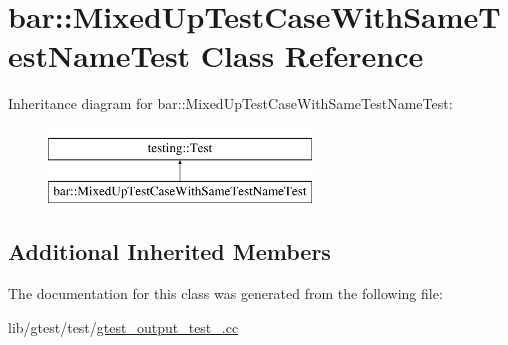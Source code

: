 \hypertarget{classbar_1_1_mixed_up_test_case_with_same_test_name_test}{\section{bar\-:\-:Mixed\-Up\-Test\-Case\-With\-Same\-Test\-Name\-Test Class Reference}
\label{classbar_1_1_mixed_up_test_case_with_same_test_name_test}
}
Inheritance diagram for bar\-:\-:Mixed\-Up\-Test\-Case\-With\-Same\-Test\-Name\-Test\-:\begin{figure}[H]
\begin{center}
\leavevmode
\includegraphics[height=2.000000cm]{classbar_1_1_mixed_up_test_case_with_same_test_name_test}
\end{center}
\end{figure}
\subsection*{Additional Inherited Members}


The documentation for this class was generated from the following file\-:\begin{DoxyCompactItemize}
\item 
lib/gtest/test/\hyperlink{gtest__output__test___8cc}{gtest\-\_\-output\-\_\-test\-\_\-.\-cc}\end{DoxyCompactItemize}
